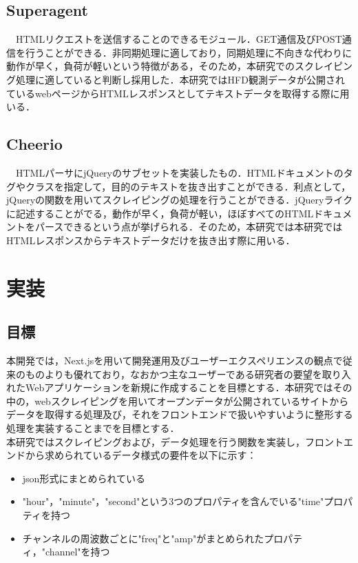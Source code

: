 \subsection{Superagent}

　HTMLリクエストを送信することのできるモジュール．GET通信及びPOST通信を行うことができる．非同期処理に適しており，同期処理に不向きな代わりに動作が早く，負荷が軽いという特徴がある，そのため，本研究でのスクレイピング処理に適していると判断し採用した．本研究ではHFD観測データが公開されているwebページからHTMLレスポンスとしてテキストデータを取得する際に用いる．\cite{superagent}
\subsection{Cheerio}

　HTMLパーサにjQueryのサブセットを実装したもの．HTMLドキュメントのタグやクラスを指定して，目的のテキストを抜き出すことができる．利点として，jQueryの関数を用いてスクレイピングの処理を行うことができる．jQueryライクに記述することがでる，動作が早く，負荷が軽い，ほぼすべてのHTMLドキュメントをパースできるという点が挙げられる．そのため，本研究では本研究ではHTMLレスポンスからテキストデータだけを抜き出す際に用いる．\cite{cheerio}
\section{実装}
\subsection{目標}
 本開発では，Next.jsを用いて開発運用及びユーザーエクスペリエンスの観点で従来のものよりも優れており，なおかつ主なユーザーである研究者の要望を取り入れたWebアプリケーションを新規に作成することを目標とする．本研究ではその中の，webスクレイピングを用いてオープンデータが公開されているサイトからデータを取得する処理及び，それをフロントエンドで扱いやすいように整形する処理を実装することまでを目標とする．\\
 本研究ではスクレイピングおよび，データ処理を行う関数を実装し，フロントエンドから求められているデータ様式の要件を以下に示す：
 \begin{itemize}
\item json形式にまとめられている
\item "hour"，"minute"，"second"という3つのプロパティを含んでいる"time"プロパティを持つ
\item チャンネルの周波数ごとに"freq"と"amp"がまとめられたプロパティ，"channel"を持つ
\end{itemize}


